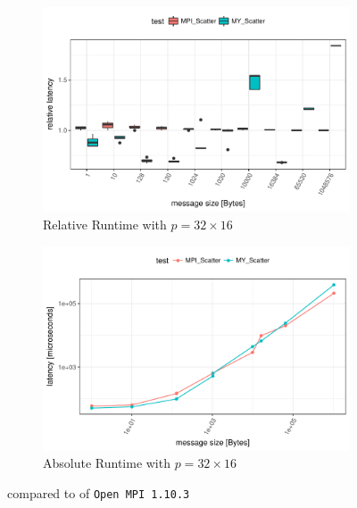 \begin{figure}[h]
    \begin{subfigure}[b]{0.49\textwidth}
        \includegraphics[width=\textwidth]{../benchmarks/openmpi/divide_conquer/scatter_32/rel_runtime.pdf}
        \caption{Relative Runtime with $p=32 \times 16$}
        \label{fig:Scatter:OpenMPI:Rel:32}
    \end{subfigure}
    \begin{subfigure}[b]{0.49\textwidth}
        \includegraphics[width=\textwidth]{../benchmarks/openmpi/divide_conquer/scatter_32/runtime.pdf}
        \caption{Absolute Runtime with $p=32 \times 16$}
        \label{fig:Scatter:OpenMPI:Abs:32}
    \end{subfigure}
    
    \caption{\myscatter compared to \mpiscatter of \texttt{Open MPI 1.10.3}}
\end{figure}

